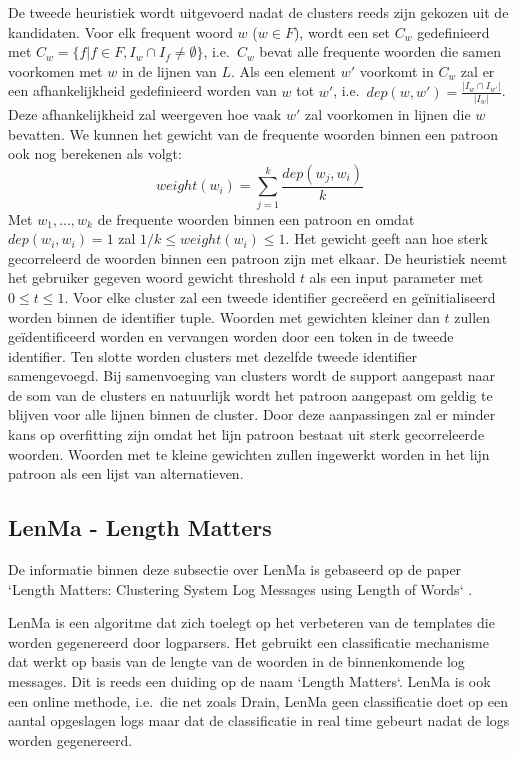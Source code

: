 \begin{itemize}
    \subitem De tweede heuristiek wordt uitgevoerd nadat de clusters reeds zijn gekozen uit de kandidaten. Voor elk frequent woord $w$ (\(w \in F\)), wordt een set \(C_{w}\) gedefinieerd met \(C_{w} = \{f \vert f \in F, I_{w} \cap I_{f} \neq \emptyset\}\), i.e.\ \(C_{w}\) bevat alle frequente woorden die samen voorkomen met $w$ in de lijnen van $L$. Als een element $w'$ voorkomt in \(C_{w}\) zal er een afhankelijkheid gedefinieerd worden van $w$ tot $w'$, i.e.\ \(dep(w, w') = \frac{\lvert I_{w} \cap I_{w'} \rvert}{\lvert I_{w} \rvert}\). Deze afhankelijkheid zal weergeven hoe vaak $w'$ zal voorkomen in lijnen die $w$ bevatten. We kunnen het gewicht van de frequente woorden binnen een patroon ook nog berekenen als volgt:
    \[weight(w_{i}) = \sum_{j=1}^{k} \frac {dep(w_{j}, w_{i})}{k}\]
    Met \(w_{1}, ..., w_{k}\) de frequente woorden binnen een patroon en omdat \(dep(w_{i}, w_{i}) = 1\) zal \(1/k \leq weight(w_{i}) \leq 1\). Het gewicht geeft aan hoe sterk gecorreleerd de woorden binnen een patroon zijn met elkaar. De heuristiek neemt het gebruiker gegeven woord gewicht threshold $t$ als een input parameter met \(0 \le t \leq 1\). Voor elke cluster zal een tweede identifier gecreëerd en geïnitialiseerd worden binnen de identifier tuple. Woorden met gewichten kleiner dan $t$ zullen geïdentificeerd worden en vervangen worden door een token in de tweede identifier. Ten slotte worden clusters met dezelfde tweede identifier samengevoegd. Bij samenvoeging van clusters wordt de support aangepast naar de som van de clusters en natuurlijk wordt het patroon aangepast om geldig te blijven voor alle lijnen binnen de cluster. Door deze aanpassingen zal er minder kans op overfitting zijn omdat het lijn patroon bestaat uit sterk gecorreleerde woorden. Woorden met te kleine gewichten zullen ingewerkt worden in het lijn patroon als een lijst van alternatieven.
\end{itemize}

\subsection{LenMa - Length Matters}
De informatie binnen deze subsectie over LenMa is gebaseerd op de paper `Length Matters: Clustering System Log Messages using Length of Words` \autocite{shima2016length}.

LenMa is een algoritme dat zich toelegt op het verbeteren van de templates die worden gegenereerd door logparsers. Het gebruikt een classificatie mechanisme dat werkt op basis van de lengte van de woorden in de binnenkomende log messages. Dit is reeds een duiding op de naam `Length Matters`. LenMa is ook een online methode, i.e.\ die net zoals Drain, LenMa geen classificatie doet op een aantal opgeslagen logs maar dat de classificatie in real time gebeurt nadat de logs worden gegenereerd. 

